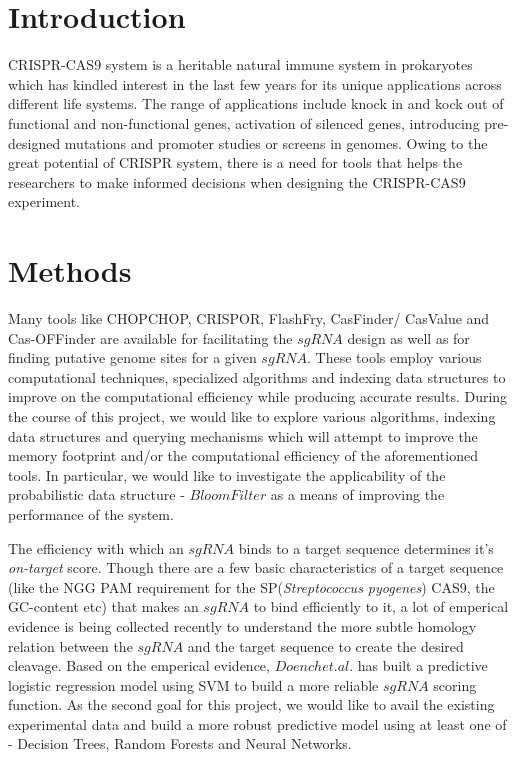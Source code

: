 \documentclass[12pt]{article}
\begin{document}
\maketitle

\section*{Introduction}

	CRISPR-CAS9 system is a heritable natural immune system in prokaryotes which has kindled interest in the last few years for its unique applications across different life systems. The range of applications include knock in and kock out of functional and non-functional genes, activation of silenced genes, introducing pre-designed mutations and promoter studies or screens in genomes. Owing to the great potential of CRISPR system, there is a need for tools that helps the researchers to make informed decisions when designing the CRISPR-CAS9 experiment.

\section*{Methods}
	Many tools like CHOPCHOP\cite{chopchop}, CRISPOR\cite{crispor}, FlashFry\cite{flash-fry}, CasFinder/ CasValue \cite{casfinder-casvalue} and Cas-OFFinder\cite{cassoffinder} are available for facilitating the $sgRNA$ design as well as for finding putative genome sites for a given $sgRNA$. These tools employ various computational techniques, specialized algorithms and indexing data structures to improve on the computational efficiency while producing accurate results. During the course of this project, we would like to explore various algorithms, indexing data structures and querying mechanisms which will attempt to improve the memory footprint and/or the computational efficiency of the aforementioned tools. In particular, we would like to investigate the applicability of the probabilistic data structure - $Bloom Filter$\cite{bloom} as a means of improving the performance of the system.

    The efficiency with which an $sgRNA$ binds to a target sequence determines it's \textit{on-target} score. Though there are a few basic characteristics of a target sequence (like the NGG PAM requirement for the SP(\textit{Streptococcus pyogenes}) CAS9, the GC-content etc) that makes an $sgRNA$ to bind efficiently to it, a lot of emperical evidence is being collected recently\cite{rational-design} to understand the more subtle homology relation between the $sgRNA$ and the target sequence to create the desired cleavage. Based on the emperical evidence, $Doench et. al.$\cite{rational-design} has built a predictive logistic regression model using SVM to build a more reliable $sgRNA$ scoring function. As the second goal for this project, we would like to avail the existing experimental data and build a more robust predictive model using at least one of - Decision Trees, Random Forests and Neural Networks.
\end{document}
